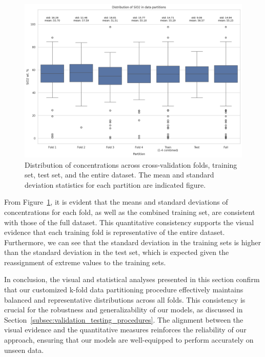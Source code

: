 \begin{figure}[htbp]
    \centering
    \includegraphics[width=\textwidth]{images/distribution_plot.png}
    \caption{Distribution of  concentrations across cross-validation folds, training set, test set, and the entire dataset. The mean and standard deviation statistics for each partition are indicated figure.}
    \label{fig:siO2_distribution}
\end{figure}

From Figure~\ref{fig:siO2_distribution}, it is evident that the means and standard deviations of  concentrations for each fold, as well as the combined training set, are consistent with those of the full dataset.
This quantitative consistency supports the visual evidence that each training fold is representative of the entire dataset.
Furthermore, we can see that the standard deviation in the training sets is higher than the standard deviation in the test set, which is expected given the reassignment of extreme values to the training sets.

In conclusion, the visual and statistical analyses presented in this section confirm that our customized k-fold data partitioning procedure effectively maintains balanced and representative distributions across all folds.
This consistency is crucial for the robustness and generalizability of our models, as discussed in Section~\ref{subsec:validation_testing_procedures}.
The alignment between the visual evidence and the quantitative measures reinforces the reliability of our approach, ensuring that our models are well-equipped to perform accurately on unseen data.